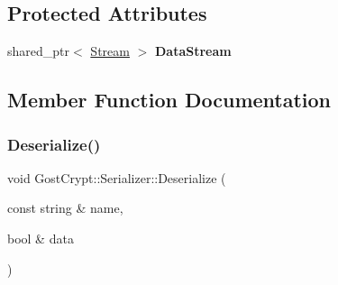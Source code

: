 \subsection*{Protected Attributes}
\begin{DoxyCompactItemize}
\item 
\mbox{\label{class_gost_crypt_1_1_serializer_aea0c1b4233af38e1a9dce4b27bd81a19}} 
shared\+\_\+ptr$<$ \hyperlink{class_gost_crypt_1_1_stream}{Stream} $>$ {\bfseries Data\+Stream}
\end{DoxyCompactItemize}


\subsection{Member Function Documentation}
\mbox{\label{class_gost_crypt_1_1_serializer_aa5b0b762052fe908fe1c1865e904164f}} 
\subsubsection{\texorpdfstring{Deserialize()}{Deserialize()}\hspace{0.1cm}{\footnotesize\ttfamily [1/10]}}
{\footnotesize\ttfamily void Gost\+Crypt\+::\+Serializer\+::\+Deserialize (\begin{DoxyParamCaption}\item[{const string \&}]{name,  }\item[{bool \&}]{data }\end{DoxyParamCaption})}



